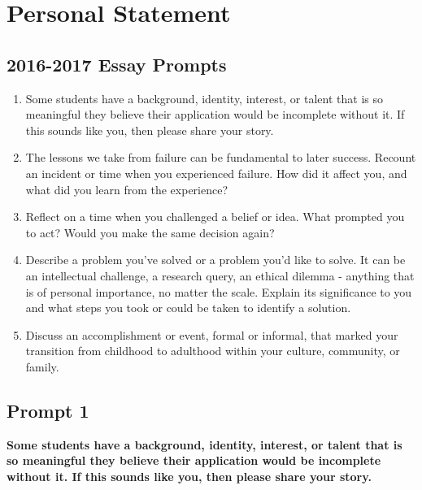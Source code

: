 
 
\thispagestyle{empty}

\titleGP %
\setcounter{tocdepth}{4}

\tableofcontents
\chapter{Personal Statement}
\section{2016-2017 Essay Prompts}
\begin{enumerate}
	\item Some students have a background, identity, interest, or talent that is so meaningful they believe their application would be incomplete without it. If this sounds like you, then please share your story.


	\item The lessons we take from failure can be fundamental to later success. Recount an incident or time when you experienced failure. How did it affect you, and what did you learn from the experience?


	\item Reflect on a time when you challenged a belief or idea. What prompted you to act? Would you make the same decision again?


	\item Describe a problem you've solved or a problem you'd like to solve. It can be an intellectual challenge, a research query, an ethical dilemma - anything that is of personal importance, no matter the scale. Explain its significance to you and what steps you took or could be taken to identify a solution.


	\item Discuss an accomplishment or event, formal or informal, that marked your transition from childhood to adulthood within your culture, community, or family.
\end{enumerate}

\section{Prompt 1}
\textbf{Some students have a background, identity, interest, or talent that is so meaningful they believe their application would be incomplete without it. If this sounds like you, then please share your story.}

